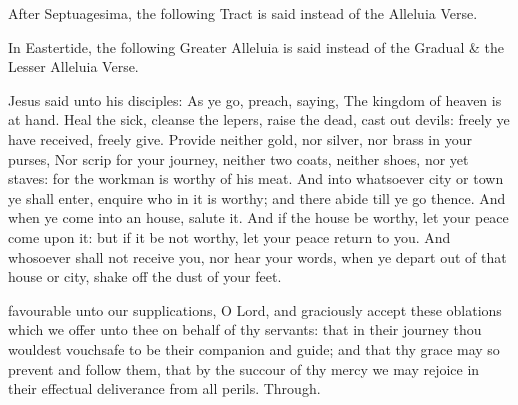 
\begin{rubric}
    After Septuagesima, the following Tract is said instead of the Alleluia Verse.
\end{rubric}


\begin{rubric}
    In Eastertide, the following Greater Alleluia is said instead of the Gradual \& the Lesser Alleluia Verse.
\end{rubric}


 Jesus said unto his disciples: As ye go, preach, saying, The kingdom of heaven is at hand. Heal the sick, cleanse the lepers, raise the dead, cast out devils: freely ye have received, freely give. Provide neither gold, nor silver, nor brass in your purses, Nor scrip for your journey, neither two coats, neither shoes, nor yet staves: for the workman is worthy of his meat. And into whatsoever city or town ye shall enter, enquire who in it is worthy; and there abide till ye go thence. And when ye come into an house, salute it. And if the house be worthy, let your peace come upon it: but if it be not worthy, let your peace return to you. And whosoever shall not receive you, nor hear your words, when ye depart out of that house or city, shake off the dust of your feet.


\secret
{} favourable unto our supplications, O Lord, and graciously accept these oblations which we offer unto thee on behalf of thy servants: that in their journey thou wouldest vouchsafe to be their companion and guide; and that thy grace may so prevent and follow them, that by the succour of thy mercy we may rejoice in their effectual deliverance from all perils. Through.

